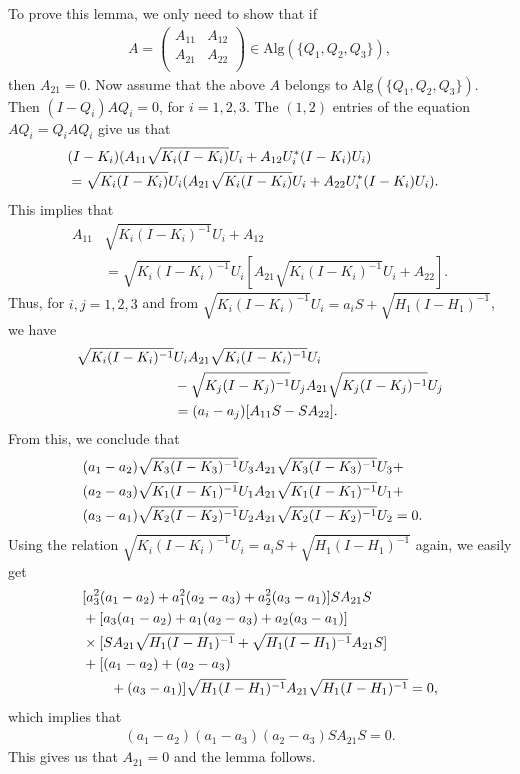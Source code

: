 \documentclass{pnastwo}
\newenvironment{proof}[1][Proof]{\begin{trivlist}
\item[\hskip \labelsep {\bfseries #1}]}{\end{trivlist}}
\newcommand{\Alg}{\mathrm{Alg}}
\begin{document}
\begin{article}
\begin{proof}
To prove this lemma, we only need to show that if
\begin{align*}
A =\left(
     \begin{array}{cc}
       A_{11} & A_{12} \\
       A_{21} & A_{22} \\
     \end{array}
   \right)\in
\Alg(\{Q_{1}, Q_{2}, Q_{3}\}),
\end{align*}
then $A_{21} = 0$.
Now assume that the above $A$ belongs to $\Alg(\{Q_1,Q_2, Q_3\})$.
Then $ (I-Q_{i})AQ_{i} = 0$, for $i=1,2,3$. The $(1,2)$ entries of
the equation $AQ_i=Q_iAQ_i$ give us that
\begin{align*}
&(I-K_i)( A_{11}\sqrt{K_i(I-K_i)}U_i+ A_{12}U_i^*(I-K_i)U_i)\cr &=
\sqrt{K_i(I-K_i)}U_i
(A_{21}\sqrt{K_i(I-K_i)}U_i+A_{22}U_i^*(I-K_i)U_i).
\end{align*}
This implies that
\begin{align*}
A_{11}&\sqrt{K_{i}(I-K_{i})^{-1}}U_{i} + A_{12} \\ &=
\sqrt{K_{i}(I-K_{i})^{-1}}U_{i}[A_{21}\sqrt{K_{i}(I-K_{i})^{-1}}U_{i}
+ A_{22}].
\end{align*}
Thus, for $i,j=1,2,3$ and from $\sqrt{K_{i}(I-K_{i})^{-1}} U_{i}
=a_{i}S + \sqrt{H_{1}(I-H_{1})^{-1}}$, we have
\begin{align*}
\sqrt{K_{i}(I  -K_{i})^{-1}} & U_{i}A_{21}
\sqrt{K_{i}(I-K_{i})^{-1}}U_{i} \\ &- \sqrt{K_{j}(I-K_{j})^{-1}}
U_{j}A_{21}\sqrt{K_{j}(I-K_{j})^{-1}}U_{j}\cr &= (a_{i}
-a_{j})[A_{11}S - SA_{22}].
\end{align*}
From this, we conclude that
\begin{align*}
&(a_{1}-a_{2})\sqrt{K_{3}(I-K_{3})^{-1}}U_{3}A_{21}
\sqrt{K_{3}(I-K_{3})^{-1}}U_{3}+\cr
&(a_{2}-a_{3})\sqrt{K_{1}(I-K_{1})^{-1}}U_{1}A_{21}
\sqrt{K_{1}(I-K_{1})^{-1}}U_{1} +\cr
&(a_{3}-a_{1})\sqrt{K_{2}(I-K_{2})^{-1}}U_{2}A_{21}
\sqrt{K_{2}(I-K_{2})^{-1}}U_{2} = 0.
\end{align*}
Using the relation $\sqrt{K_{i}(I-K_{i})^{-1}}U_{i} = a_{i}S +
\sqrt{H_{1}(I-H_{1})^{-1}}$ again, we easily get
\begin{align*}
&[a_{3}^{2}(a_{1} - a_{2}) + a_{1}^{2}(a_{2} - a_{3}) +
a_{2}^{2}(a_{3} - a_{1})]SA_{21}S \cr &+[a_{3}(a_{1} - a_{2}) +
a_{1}(a_{2} - a_{3}) + a_{2}(a_{3} -
a_{1})]\\
&\times [SA_{21}\sqrt{H_{1}(I-H_{1})^{-1}}+
\sqrt{H_{1}(I-H_{1})^{-1}}A_{21}S] \cr &+[(a_{1} - a_{2}) + (a_{2}
- a_{3}) \\ & \qquad + (a_{3} -
a_{1})]\sqrt{H_{1}(I-H_{1})^{-1}}A_{21}\sqrt{H_{1}(I-H_{1})^{-1}}
= 0,
\end{align*}
which implies that
\begin{align*}
(a_{1} - a_{2})(a_{1} - a_{3})(a_{2} - a_{3})SA_{21}S = 0.
\end{align*}
This gives us that $A_{21} = 0$ and the lemma follows.
\end{proof}


\end{article}
\end{document}
